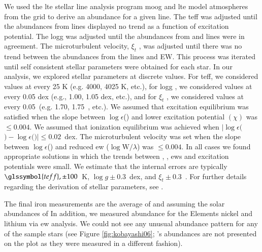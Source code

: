 We used the \gls{lte} stellar line analysis program \gls{moog} and \gls{lte} model atmospheres from the \citet{2003IAUS..210P.A20C} grid to derive an abundance for a given line. The \gls{teff} was adjusted until the abundances from  lines displayed no trend as a function of excitation potential. The \gls{logg} was adjusted until the abundances from  and  lines were in agreement. The microturbulent velocity, $\xi _{t}$ , was adjusted until there was no trend between the abundances from the  lines and EW. This process was iterated until self consistent stellar parameters were obtained  for each star. In our analysis, we explored stellar parameters at discrete values. For \gls{teff}, we considered values at every 25 K (e.g. 4000, 4025 K, etc.), for \gls{logg} , we considered values at every 0.05 dex (e.g., 1.00, 1.05 dex, etc.), and for $\xi _{t}$ , we considered values at every 0.05~\kms (e.g. 1.70, 1.75~\kms, etc.). We assumed that excitation equilibrium was satisfied when the slope between $\log{\epsilon}$() and lower excitation potential $(\chi)$ was $\leq0.004$. We assumed that ionization equilibrium was achieved when $\vert\log{\epsilon} ($$) - \log{\epsilon} ($$)\vert \leq 0.02$~dex. The microturbulent velocity was set when the slope between $\log{\epsilon}$() and reduced \gls{ew} ($\log{\textrm{W}}/\lambda$) was $\leq0.004$. In all cases we found appropriate solutions in which the trends between , , \glspl{ew} and excitation potentials were small. We estimate that the internal errors are typically $\glssymbol{teff}, \pm100$~K, $\log{g}\pm0.3$~dex, and $\xi _{t}\pm0.3$~\kms. For further details regarding the derivation of stellar parameters, see \citet{2008ApJ...673..854Y}.

The final iron measurements are the average of  and  assuming the solar abundances of \citet{2009ARA&A..47..481A} 
In addition, we measured abundance for the Elements nickel and lithium via \gls{ew} analysis. We could not see any unusual abundance pattern for any of the sample stars (see Figure \ref{fig:kobayashi06}; \starb's abundances are not presented on the plot as they were measured in a different fashion).  



